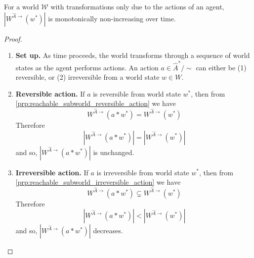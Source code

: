 \begin{proposition}
    For a world $\mathscr{W}$ with transformations only due to the actions of an agent, $|W^{\hat{A}\to}(w^{*})|$ is monotonically non-increasing over time.
\end{proposition}
\begin{proof}
\begin{enumerate}
    \item \textbf{Set up.}
    As time proceeds, the world transforms through a sequence of world states as the agent performs actions.
    An action $a \in \hat{A}^{*}/\sim$ can either be (1) reversible, or (2) irreversible from a world state $w \in W$.
    
    \item \textbf{Reversible action.}
    If $a$ is reversible from world state $w^{*}$, then from \cref{prp:reachable_subworld_reversible_action} we have
    \begin{equation}
        W^{\hat{A}\to}(a \ast w^{*}) = W^{\hat{A}\to}(w^{*})
    \end{equation}
    Therefore
    \begin{equation}
        |W^{\hat{A}\to}(a \ast w^{*})| = |W^{\hat{A}\to}(w^{*})|
    \end{equation}
    and so, $|W^{\hat{A}\to}(a \ast w^{*})|$ is unchanged.

    \item \textbf{Irreversible action.}
    If $a$ is irreversible from world state $w^{*}$, then from \cref{prp:reachable_subworld_irreversible_action} we have
    \begin{equation}
        W^{\hat{A}\to}(a \ast w^{*}) \subsetneq W^{\hat{A}\to}(w^{*})
    \end{equation}
    Therefore
    \begin{equation}
        |W^{\hat{A}\to}(a \ast w^{*})| < |W^{\hat{A}\to}(w^{*})|
    \end{equation}
    and so, $|W^{\hat{A}\to}(a \ast w^{*})|$ decreases.
\end{enumerate}



\end{proof}





